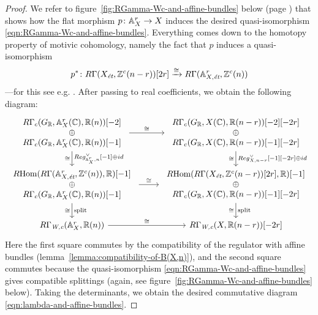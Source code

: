 \documentclass{article}
\numberwithin{equation}{section}
\begin{document}
\begin{lemma}
  \begin{proof}
    We refer to figure~\ref{fig:RGamma-Wc-and-affine-bundles} below (page
    \pageref{fig:RGamma-Wc-and-affine-bundles}) that shows how the flat morphism
    $p\colon \AA^r_X \to X$ induces the desired quasi-isomorphism
    \eqref{eqn:RGamma-Wc-and-affine-bundles}. Everything comes down to the
    homotopy property of motivic cohomology, namely the fact that $p$ induces a
    quasi-isomorphism
    \[ p^*\colon R\Gamma (X_\et, \ZZ^c (n-r)) [2r] \xrightarrow{\cong}
      R\Gamma (\AA^r_{X,\et}, \ZZ^c (n)) \]
    ---for this see e.g. \cite[Lemma~5.11]{Morin-2014}.
    After passing to real coefficients, we obtain the following diagram:
    \[ \begin{tikzcd}
        \begin{array}{c} R\Gamma_c (G_\RR, \AA^r_X (\CC), \RR (n)) [-2] \\ \oplus \\ R\Gamma_c (G_\RR, \AA^r_X (\CC), \RR (n)) [-1] \end{array} \ar{d}{Reg_{\AA^r_X,n}^\vee [-1] \oplus id}[swap]{\cong} \ar{r}{\cong} & \begin{array}{c} R\Gamma_c (G_\RR, X (\CC), \RR (n-r)) [-2] [-2r] \\ \oplus \\ R\Gamma_c (G_\RR, X (\CC), \RR (n-r)) [-1] [-2r] \end{array} \ar{d}{Reg_{X,n-r}^\vee [-1] [-2r] \oplus id}[swap]{\cong} \\
        \begin{array}{c} \RHom (R\Gamma (\AA^r_{X,\et}, \ZZ^c (n)), \RR) [-1] \\ \oplus \\ R\Gamma_c (G_\RR, \AA^r_X (\CC), \RR (n)) [-1] \end{array} \ar{d}{\text{split}}[swap]{\cong} \ar{r}{\cong} & \begin{array}{c} \RHom (R\Gamma (X_\et, \ZZ^c (n-r)) [2r], \RR) [-1] \\ \oplus \\ R\Gamma_c (G_\RR, X (\CC), \RR (n-r)) [-1] [-2r] \end{array} \ar{d}{\text{split}}[swap]{\cong} \\
        R\Gamma_\Wc (\AA^r_X, \RR (n)) \ar{r}{\cong} & R\Gamma_\Wc (X, \RR (n-r)) [-2r]
      \end{tikzcd} \]
    Here the first square commutes by the compatibility of the regulator with
    affine bundles (lemma~\ref{lemma:compatibility-of-B(X,n)}), and the second
    square commutes because the quasi-isomorphism
    \eqref{eqn:RGamma-Wc-and-affine-bundles} gives compatible splittings
    (again, see figure~\ref{fig:RGamma-Wc-and-affine-bundles} below).
    Taking the determinants, we obtain the desired commutative diagram
    \eqref{eqn:lambda-and-affine-bundles}.
  \end{proof}
\end{lemma}
\end{document}
